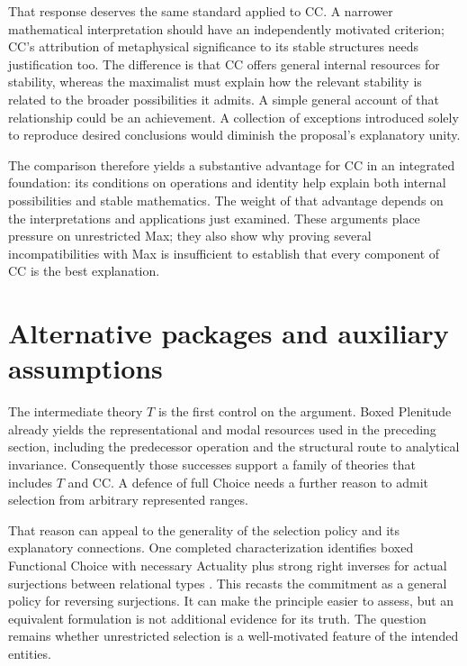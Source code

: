 \documentclass[11pt]{article}
\begin{document}
That response deserves the same standard applied to CC. A narrower mathematical interpretation should have an independently motivated criterion; CC's attribution of metaphysical significance to its stable structures needs justification too. The difference is that CC offers general internal resources for stability, whereas the maximalist must explain how the relevant stability is related to the broader possibilities it admits. A simple general account of that relationship could be an achievement. A collection of exceptions introduced solely to reproduce desired conclusions would diminish the proposal's explanatory unity.

The comparison therefore yields a substantive advantage for CC in an integrated foundation: its conditions on operations and identity help explain both internal possibilities and stable mathematics. The weight of that advantage depends on the interpretations and applications just examined. These arguments place pressure on unrestricted Max; they also show why proving several incompatibilities with Max is insufficient to establish that every component of CC is the best explanation.

\section{Alternative packages and auxiliary assumptions}\label{sec:alternatives}

The intermediate theory $T$ is the first control on the argument. Boxed Plenitude already yields the representational and modal resources used in the preceding section, including the predecessor operation and the structural route to analytical invariance. Consequently those successes support a family of theories that includes $T$ and CC. A defence of full Choice needs a further reason to admit selection from arbitrary represented ranges.

That reason can appeal to the generality of the selection policy and its explanatory connections. One completed characterization identifies boxed Functional Choice with necessary Actuality plus strong right inverses for actual surjections between relational types \citep[\S\S1--4]{sections}. This recasts the commitment as a general policy for reversing surjections. It can make the principle easier to assess, but an equivalent formulation is not additional evidence for its truth. The question remains whether unrestricted selection is a well-motivated feature of the intended entities.
\end{document}
